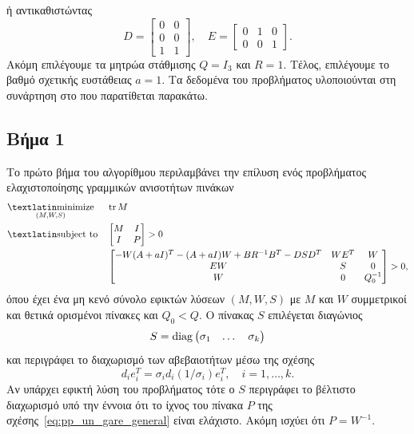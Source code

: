 ή αντικαθιστώντας
\[
    D =
    \begin{bmatrix}
        0 & 0 \\
        0 & 0 \\
        1 & 1
    \end{bmatrix}, \quad
    E =
    \begin{bmatrix}
        0 & 1 & 0 \\
        0 & 0 & 1
    \end{bmatrix}.
\]
Ακόμη επιλέγουμε τα μητρώα στάθμισης \( Q = I_3 \) και \( R = 1 \). Τέλος,
επιλέγουμε το βαθμό σχετικής ευστάθειας \( a = 1 \). Τα δεδομένα του
προβλήματος υλοποιούνται στη συνάρτηση  στο  που
παρατίθεται παρακάτω.
\eng{}

\subsection{Βήμα 1}
Το πρώτο βήμα του αλγορίθμου περιλαμβάνει την επίλυση ενός προβλήματος
ελαχιστοποίησης γραμμικών ανισοτήτων πινάκων
\begin{equation*}
    \begin{aligned}
        & \underset{
            (M, W, S)
        }{\mathtxt{minimize}}
        & & \tr M \\
        & \mathtxt{subject to}
        & &
        \begin{bmatrix}
            M & I \\
            I & P
        \end{bmatrix} > 0 \\
        &&&
        \begin{bmatrix}
            -W(A + aI)^T - (A + aI)W + BR^{-1}B^T
            - DSD^T & WE^T & W \\
            EW & S & 0 \\
            W & 0 & Q_0^{-1}\\
        \end{bmatrix} > 0,
    \end{aligned}
\end{equation*}
όπου έχει ένα μη κενό σύνολο εφικτών λύσεων \( (M, W, S) \) με \( M \) και \( W
\) συμμετρικοί και θετικά ορισμένοι πίνακες και \( Q_0 < Q \). Ο πίνακας \( S \)
επιλέγεται διαγώνιος
\[
    S = \operatorname{diag}\begin{pmatrix} \sigma_1 & \dots & \sigma_k\end{pmatrix}
\]
και περιγράφει το διαχωρισμό των αβεβαιοτήτων μέσω της σχέσης
\begin{equation}\label{eq:pp_sep}
    d_ie_i^T = \sigma_i d_i (1/\sigma_i)e_i^T, \quad i = 1, \dots ,k.
\end{equation}
Αν υπάρχει εφικτή λύση του προβλήματος τότε ο \( S \) περιγράφει το βέλτιστο
διαχωρισμό υπό την έννοια ότι το ίχνος του πίνακα \( P \) της
σχέσης~\eqref{eq:pp_un_gare_general} είναι ελάχιστο. Ακόμη ισχύει ότι \( P =
W^{-1} \).

